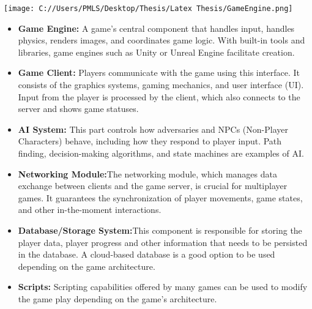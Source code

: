 \texttt{[image: C://Users/PMLS/Desktop/Thesis/Latex Thesis/GameEngine.png]}

\begin{itemize}
	\item\textbf{Game Engine:} A game's central component that handles input, handles physics, renders images, and coordinates game logic. With built-in tools and libraries, game engines such as Unity or Unreal Engine facilitate creation.
	\item \textbf{Game Client:} Players communicate with the game using this interface. It consists of the graphics systems, gaming mechanics, and user interface (UI). Input from the player is processed by the client, which also connects to the server and shows game statuses.
	\item \textbf{AI System:} This part controls how adversaries and NPCs (Non-Player Characters) behave, including how they respond to player input. Path finding, decision-making algorithms, and state machines are examples of AI.
	\item \textbf{Networking Module:}The networking module, which manages data exchange between clients and the game server, is crucial for multiplayer games. It guarantees the synchronization of player movements, game states, and other in-the-moment interactions.
	\item \textbf{Database/Storage System:}This component is responsible for storing the player data, player progress and other information that needs to be persisted in the database. A cloud-based database is a good option to be used depending on the game architecture.
	\item \textbf{Scripts:} Scripting capabilities offered by many games can be used to modify the game play depending on the game's architecture.
\end{itemize}

